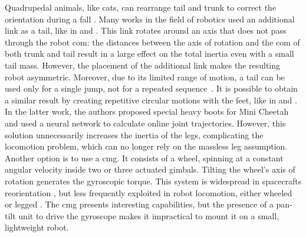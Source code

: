 \documentclass[sensors,article,submit,pdftex,moreauthors]{Definitions/mdpi}
\begin{document}
Quadrupedal animals, like cats, can rearrange tail and trunk to correct the orientation during a fall \cite{kane1969dynamical}.
Many works in the field of robotics used an additional link as a tail, like in \cite{chu2019null} and \cite{wenger2016frontal}.
This link rotates around an axis that does not pass through the robot \gls{com}: the distances between the axis of rotation and the \gls{com} of both trunk and tail result in a large effect on the total inertia even with a small tail mass.
However, the placement of the additional link makes the resulting robot asymmetric. Moreover, due to its limited range of motion, a tail can be used only for a single jump, not for a repeated sequence~\cite{johnson2012tail}.
It is possible to obtain a similar result by creating repetitive circular motions with the feet, like in \cite{hoffman2021exploiting} and \cite{kurtz2021mini}. In the latter work, the authors proposed special heavy boots for Mini Cheetah and used a neural network to calculate online joint trajectories. However, this solution unnecessarily increases the inertia of the legs, complicating the locomotion problem, which can no longer rely on the massless leg assumption. %
Another option is to use a \gls{cmg}.
It consists of a wheel, spinning at a constant angular velocity inside two or three actuated gimbals.
Tilting the wheel's axis of rotation generates the gyroscopic torque.
This system is widespread in spacecrafts reorientation \cite{yoon2002spacecraft}, but less frequently exploited in robot locomotion, either wheeled \cite{brown1996single} or legged \cite{mikhalkov2021gyrubot}.
The \gls{cmg} presents interesting capabilities, but the presence of a pan-tilt unit to drive the gyroscope makes it impractical to mount it on a small, lightweight robot.
\end{document}
